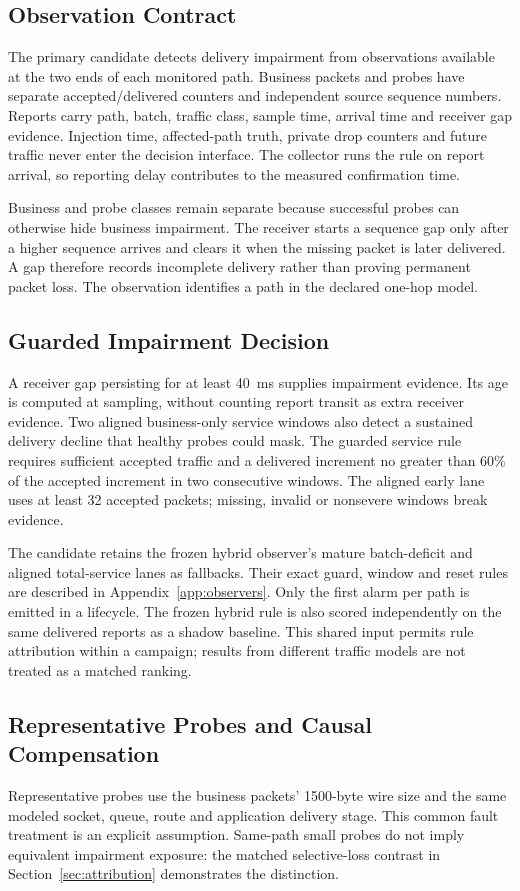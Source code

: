 \documentclass[sigconf]{acmart}
\begin{document}
\subsection{Observation Contract}
The primary candidate detects delivery impairment from observations
available at the two ends of each monitored path. Business packets and
probes have separate accepted/delivered counters and independent source
sequence numbers. Reports carry path, batch, traffic class, sample time,
arrival time and receiver gap evidence. Injection time, affected-path truth,
private drop counters and future traffic never enter the decision interface.
The collector runs the rule on report arrival, so reporting delay contributes
to the measured confirmation time.

Business and probe classes remain separate because successful probes can
otherwise hide business impairment. The receiver starts a sequence gap only
after a higher sequence arrives and clears it when the missing packet is
later delivered. A gap therefore records incomplete delivery rather than
proving permanent packet loss. The observation identifies a path in the
declared one-hop model.

\subsection{Guarded Impairment Decision}
A receiver gap persisting for at least 40~ms supplies impairment evidence.
Its age is computed at sampling, without counting report transit as extra
receiver evidence. Two aligned business-only service windows also detect
a sustained delivery decline that healthy probes could mask. The guarded
service rule requires sufficient accepted traffic and a delivered increment
no greater than 60\% of the accepted increment in two consecutive windows.
The aligned early lane uses at least 32 accepted packets; missing, invalid
or nonsevere windows break evidence.

The candidate retains the frozen hybrid observer's mature batch-deficit
and aligned total-service lanes as fallbacks. Their exact guard, window
and reset rules are described in Appendix~\ref{app:observers}. Only the
first alarm per path is emitted in a lifecycle. The frozen hybrid rule
is also scored independently on the same delivered reports as a shadow
baseline. This shared input permits rule attribution within a campaign;
results from different traffic models are not treated as a matched ranking.

\subsection{Representative Probes and Causal Compensation}
Representative probes use the business packets' 1500-byte wire size and
the same modeled socket, queue, route and application delivery stage.
This common fault treatment is an explicit assumption. Same-path small
probes do not imply equivalent impairment exposure: the matched selective-loss
contrast in Section~\ref{sec:attribution} demonstrates the distinction.
\end{document}
